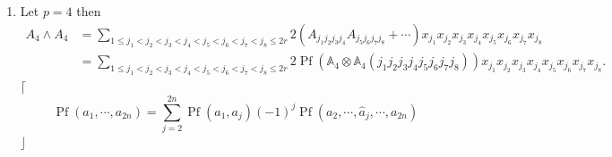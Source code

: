 \documentclass[aps, preprint]{revtex4}
\begin{document}
\begin{enumerate}
\item Let $p =4$ then
\begin{align}A_{4} \wedge A_{4} &  =\sum _{1 \leq j_{1} <j_{2} <j_{3} <j_{4} <j_{5} <j_{6} <j_{7} <j_{8} \leq 2 r}2 \left (A_{j_{1} j_{2} j_{3} j_{4}} A_{j_{5} j_{6} j_{7} j_{8}} +\cdots \right ) x_{j_{1}} x_{j_{2}} x_{j_{3}} x_{j_{4}} x_{j_{5}} x_{j_{6}} x_{j_{7}} x_{j_{8}} \\
 &  =\sum _{1 \leq j_{1} <j_{2} <j_{3} <j_{4} <j_{5} <j_{6} <j_{7} <j_{8} \leq 2 r}2 \ensuremath{\operatorname*{Pf}} \left (\mathbb{A}_{4} \otimes \mathbb{A}_{4} \left (j_{1} j_{2} j_{3} j_{4} j_{5} j_{6} j_{7} j_{8}\right )\right ) x_{j_{1}} x_{j_{2}} x_{j_{3}} x_{j_{4}} x_{j_{5}} x_{j_{6}} x_{j_{7}} x_{j_{8}}\text{.}\end{align}$\lceil $
\begin{equation}\ensuremath{\operatorname*{Pf}} \left (a_{1} ,\cdots  ,a_{2 n}\right ) =\sum _{j =2}^{2 n}\ensuremath{\operatorname*{Pf}} \left (a_{1} ,a_{j}\right ) \left ( -1\right )^{j} \ensuremath{\operatorname*{Pf}} \left (a_{2} ,\cdots  ,\hat{a}_{j} ,\cdots  ,a_{2 n}\right )
\end{equation}$\rfloor $ 


\end{enumerate}
\end{document}
